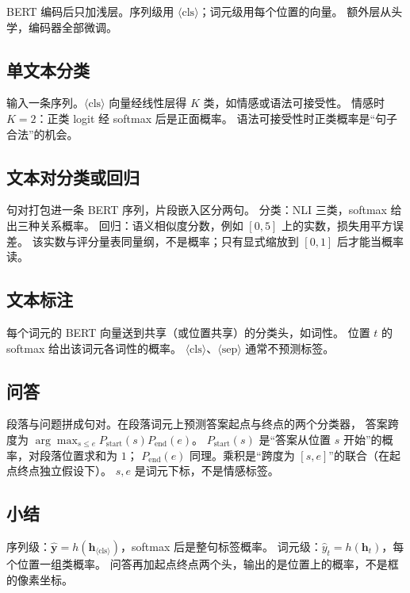 BERT 编码后只加浅层。序列级用 $\langle\mathrm{cls}\rangle$；词元级用每个位置的向量。
额外层从头学，编码器全部微调。

\subsection{单文本分类}

输入一条序列。$\langle\mathrm{cls}\rangle$ 向量经线性层得 $K$ 类，如情感或语法可接受性。
情感时 $K=2$：正类 logit 经 softmax 后是正面概率。
语法可接受性时正类概率是“句子合法”的机会。

\subsection{文本对分类或回归}

句对打包进一条 BERT 序列，片段嵌入区分两句。
分类：NLI 三类，softmax 给出三种关系概率。
回归：语义相似度分数，例如 $[0,5]$ 上的实数，损失用平方误差。
该实数与评分量表同量纲，不是概率；只有显式缩放到 $[0,1]$ 后才能当概率读。

\subsection{文本标注}

每个词元的 BERT 向量送到共享（或位置共享）的分类头，如词性。
位置 $t$ 的 softmax 给出该词元各词性的概率。
$\langle\mathrm{cls}\rangle$、$\langle\mathrm{sep}\rangle$ 通常不预测标签。

\subsection{问答}

段落与问题拼成句对。在段落词元上预测答案起点与终点的两个分类器，
答案跨度为 $\arg\max_{s\leq e}P_{\mathrm{start}}(s)P_{\mathrm{end}}(e)$。
$P_{\mathrm{start}}(s)$ 是“答案从位置 $s$ 开始”的概率，对段落位置求和为 $1$；
$P_{\mathrm{end}}(e)$ 同理。乘积是“跨度为 $[s,e]$”的联合（在起点终点独立假设下）。
$s,e$ 是词元下标，不是情感标签。

\subsection{小结}

序列级：$\hat{\bm{y}}=h(\bm{h}_{\langle\mathrm{cls}\rangle})$，softmax 后是整句标签概率。
词元级：$\hat y_t=h(\bm{h}_t)$，每个位置一组类概率。
问答再加起点终点两个头，输出的是位置上的概率，不是框的像素坐标。

